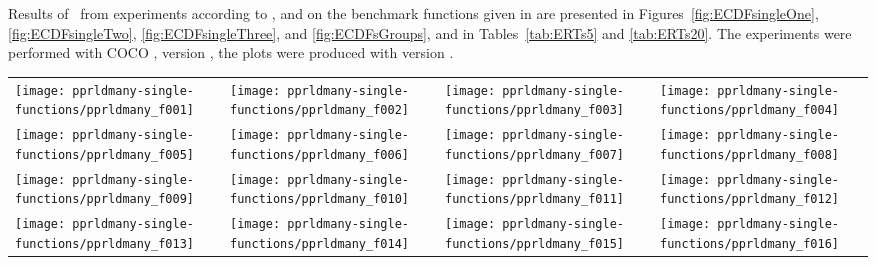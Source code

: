 \documentclass[sigconf]{acmart}
\begin{document}
Results of \algname\ from experiments according to \cite{hansen2016exp}, \cite{hansen2016perfass} and \cite{biobj2016perfass} on the benchmark
functions given in \cite{biobj2016func} are presented in
Figures~\ref{fig:ECDFsingleOne}, \ref{fig:ECDFsingleTwo}, \ref{fig:ECDFsingleThree}, and \ref{fig:ECDFsGroups}, and in
Tables~\ref{tab:ERTs5} and \ref{tab:ERTs20}. The experiments were performed with COCO \cite{hansen2020cocoplat},
version \change{\version}, the plots were produced with version \change{\version}.



\begin{figure*}
\centering
\begin{tabular}{@{\hspace*{-0.018\textwidth}}l@{\hspace*{-0.02\textwidth}}l@{\hspace*{-0.02\textwidth}}l@{\hspace*{-0.02\textwidth}}l@{\hspace*{-0.02\textwidth}}}
\texttt{[image: pprldmany-single-functions/pprldmany\_f001]}&
\texttt{[image: pprldmany-single-functions/pprldmany\_f002]}&
\texttt{[image: pprldmany-single-functions/pprldmany\_f003]}&
\texttt{[image: pprldmany-single-functions/pprldmany\_f004]}\\
\texttt{[image: pprldmany-single-functions/pprldmany\_f005]}&
\texttt{[image: pprldmany-single-functions/pprldmany\_f006]}&
\texttt{[image: pprldmany-single-functions/pprldmany\_f007]}&
\texttt{[image: pprldmany-single-functions/pprldmany\_f008]}\\
\texttt{[image: pprldmany-single-functions/pprldmany\_f009]}&
\texttt{[image: pprldmany-single-functions/pprldmany\_f010]}&
\texttt{[image: pprldmany-single-functions/pprldmany\_f011]}&
\texttt{[image: pprldmany-single-functions/pprldmany\_f012]}\\
\texttt{[image: pprldmany-single-functions/pprldmany\_f013]}&
\texttt{[image: pprldmany-single-functions/pprldmany\_f014]}&
\texttt{[image: pprldmany-single-functions/pprldmany\_f015]}&
\texttt{[image: pprldmany-single-functions/pprldmany\_f016]}\\[-1.8ex]
\end{tabular}
 \caption{\label{fig:ECDFsingleOne}
}

\end{figure*}
\end{document}

